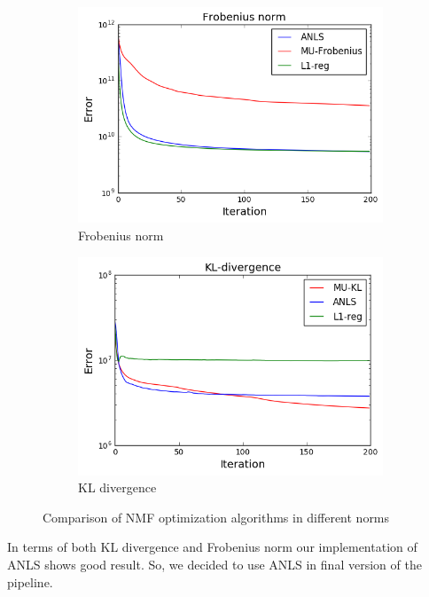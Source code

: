 \documentclass[11pt]{article}
\begin{document}
\begin{figure}[H]
	\begin{subfigure}{.5\textwidth}
		\centering
		\includegraphics[width=1.0\linewidth]{gr1.png}
		\caption{Frobenius norm}
		\label{fig:frob}
	\end{subfigure}
	\begin{subfigure}{.5\textwidth}
		\centering
		\includegraphics[width=1.0\linewidth]{gr2.png}
		\caption{KL divergence}
		\label{fig:kl}
	\end{subfigure}
	\caption{Comparison of NMF optimization algorithms in different norms}
	\label{fig:NMFoptimization}
\end{figure}

In terms of both KL divergence and Frobenius norm our implementation of ANLS shows good result. So, we decided to use ANLS in final version of the pipeline.
\end{document}
